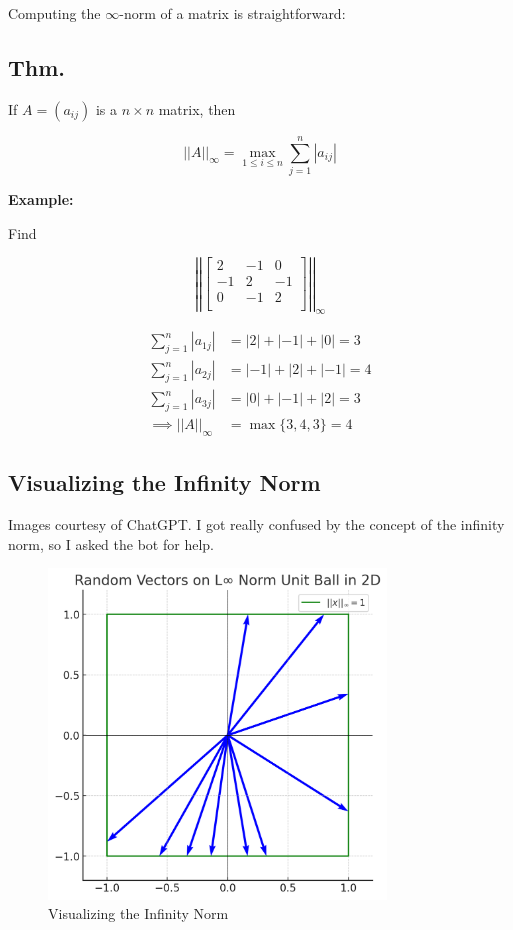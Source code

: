 Computing the $\infty$-norm of a matrix is straightforward:

\subsection{Thm.}

If $A=(a_{ij})$ is a $n \times n$ matrix, then

\begin{equation*}
  ||A||_\infty = \max_{1\leq i \leq n} \sum_{j=1}^n |a_{ij}|
\end{equation*}

\textbf{Example:}

Find 

\begin{equation*}
  \left|\left| \begin{bmatrix}
  2 & -1 & 0\\
  -1 & 2 & -1\\
  0 & -1 & 2\\
  \end{bmatrix} \right|\right|_\infty
\end{equation*}

\begin{align*}
  \sum_{j=1}^n |a_{1j}| &= |2| + |-1| + |0| = 3 \\
  \sum_{j=1}^n |a_{2j}| &= |-1| + |2| + |-1| = 4 \\
  \sum_{j=1}^n |a_{3j}| &= |0| + |-1| + |2| = 3 \\
  \implies ||A||_\infty &= \max\{3, 4, 3\} = 4
\end{align*}

\pagebreak
\subsection{Visualizing the Infinity Norm}

Images courtesy of ChatGPT. I got really confused by the concept of the
infinity norm, so I asked the bot for help.

\begin{figure}[h]
  \centering
  \includegraphics[width=0.8\textwidth]{./assets/infinity_norm.png}
  \caption{Visualizing the Infinity Norm}
\end{figure}

